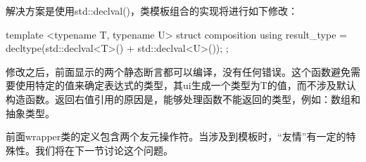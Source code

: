 解决方案是使用std::declval()，类模板组合的实现将进行如下修改：

\begin{cpp}
template <typename T, typename U>
struct composition
{
	using result_type = decltype(std::declval<T>() +
								 std::declval<U>());
};
\end{cpp}

修改之后，前面显示的两个静态断言都可以编译，没有任何错误。这个函数避免需要使用特定的值来确定表达式的类型，其ui生成一个类型为T的值，而不涉及默认构造函数。返回右值引用的原因是，能够处理函数不能返回的类型，例如：数组和抽象类型。

前面wrapper类的定义包含两个友元操作符。当涉及到模板时，“友情”有一定的特殊性。我们将在下一节讨论这个问题。

















